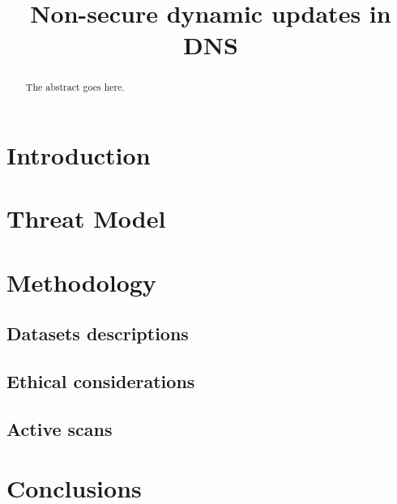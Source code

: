 \documentclass[conference]{IEEEtran}
\begin{document}
\title{Non-secure dynamic updates in DNS}

\author{
\and
{}
\and
{}
}

\maketitle



\begin{abstract}
The abstract goes here.
\end{abstract}

\section{Introduction}





\section{Threat Model}
\section{Methodology}
\subsection{Datasets descriptions}
\subsection{Ethical considerations}
\subsection{Active scans}








\section{Conclusions}


 
\end{document}

